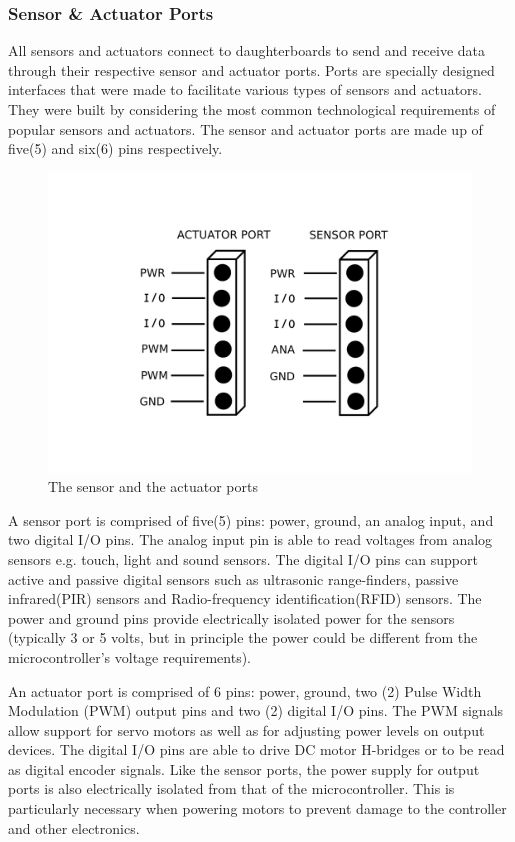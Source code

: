 	\subsubsection{Sensor \& Actuator Ports} %
	\label{ssub:input_&_output_ports}
	All sensors and actuators connect to daughterboards to send and receive data through their respective sensor and actuator ports. Ports are specially designed interfaces that were made to facilitate various types of sensors and actuators. They were built by considering the most common technological requirements of popular sensors and actuators. The sensor and actuator ports are made up of five(5) and six(6) pins respectively.

\begin{figure}[h]
  \begin{center}
    \includegraphics[width=0.5\columnwidth]{Figures/Ports.pdf}
    \caption{The sensor and the actuator ports}
  \end{center}
\end{figure}

 A sensor port is comprised of five(5) pins: power, ground, an analog input, and two digital I/O pins. The analog input pin is able to read voltages from analog sensors e.g. touch, light and sound sensors. The digital I/O pins can support active and passive digital sensors such as ultrasonic range-finders,  passive infrared(PIR) sensors and Radio-frequency identification(RFID) sensors. The power and ground pins provide electrically isolated power for the sensors (typically 3 or 5 volts, but in principle the power could be different from the microcontroller's voltage requirements).

An actuator port is comprised of 6 pins: power, ground, two (2) Pulse Width Modulation (PWM) output pins and two (2) digital I/O pins. The PWM signals allow support for servo motors as well as for adjusting power levels on output devices. The digital I/O pins are able to drive DC motor H-bridges or to be read as digital encoder signals. Like the sensor ports, the power supply for output ports is also electrically isolated from that of the microcontroller. This is particularly necessary when powering motors to prevent damage to the controller and other electronics.

